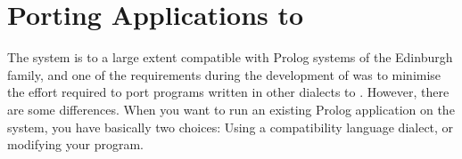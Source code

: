 %
% 
% 
% 
% 
%
%

\chapter{Porting Applications to {\eclipse}}
\label{chapporting}

The {\eclipse} system is to a large extent compatible with Prolog systems
of the Edinburgh family, and one of the requirements during the development
of {\eclipse} was to minimise the effort required to port
programs written in other dialects to {\eclipse}.
However, there are some differences.
When you want to run an existing Prolog application on the {\eclipse} system,
you have basically two choices:
Using a compatibility language dialect, or modifying your program.

